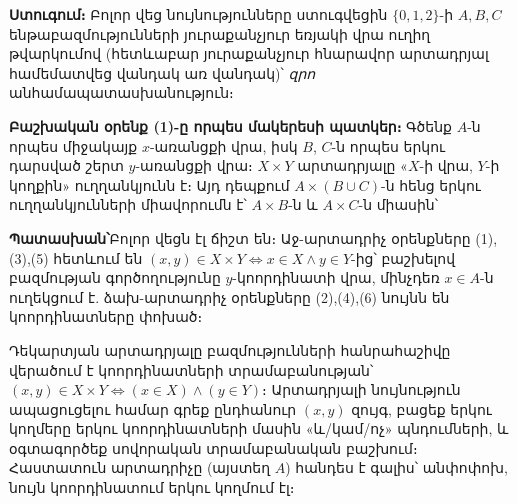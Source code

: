 \documentclass[11pt,a4paper]{article}
\newcommand{\answer}[1]{\begin{answerbox}\centering\textbf{Պատասխան՝}\quad #1\end{answerbox}}
\begin{document}
\textbf{Ստուգում։} Բոլոր վեց նույնությունները ստուգվեցին $\{0,1,2\}$-ի $A,B,C$ ենթաբազմությունների
յուրաքանչյուր եռյակի վրա ուղիղ թվարկումով (հետևաբար յուրաքանչյուր հնարավոր արտադրյալ համեմատվեց վանդակ առ
վանդակ)՝ \emph{զրո} անհամապատասխանություն։ \checkmark

\textbf{Բաշխական օրենք (1)-ը որպես մակերեսի պատկեր։} Գծենք $A$-ն որպես միջակայք $x$-առանցքի վրա, իսկ $B$,
$C$-ն որպես երկու դարսված շերտ $y$-առանցքի վրա։ $X\times Y$ արտադրյալը «$X$-ի վրա, $Y$-ի կողքին»
ուղղանկյունն է։ Այդ դեպքում $A\times(B\cup C)$-ն հենց երկու ուղղանկյունների միավորումն է՝
$A\times B$-ն և $A\times C$-ն միասին՝

\begin{center}
\end{center}

\answer{Բոլոր վեցն էլ ճիշտ են։ Աջ-արտադրիչ օրենքները (1),(3),(5) հետևում են
$(x,y)\in X\times Y\iff x\in X\wedge y\in Y$-ից՝ բաշխելով բազմության գործողությունը $y$-կոորդինատի վրա,
մինչդեռ $x\in A$-ն ուղեկցում է. ձախ-արտադրիչ օրենքները (2),(4),(6) նույնն են կոորդինատները փոխած։}

\begin{methodbox}
Դեկարտյան արտադրյալը բազմությունների հանրահաշիվը վերածում է կոորդինատների
տրամաբանության՝ $(x,y)\in X\times Y\iff (x\in X)\wedge(y\in Y)$։ Արտադրյալի նույնություն ապացուցելու
համար գրեք ընդհանուր $(x,y)$ զույգ, բացեք երկու կողմերը երկու կոորդինատների մասին «և/կամ/ոչ» պնդումների, և
օգտագործեք սովորական տրամաբանական բաշխում։ Հաստատուն արտադրիչը (այստեղ $A$) հանդես է գալիս՝
անփոփոխ, նույն կոորդինատում երկու կողմում էլ։
\end{methodbox}
\end{document}
